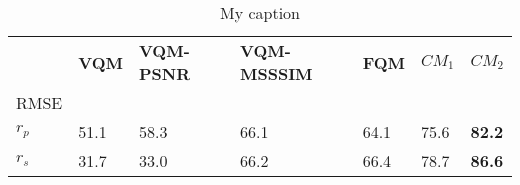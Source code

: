\begin{table}[]
\centering
\caption{My caption}
\label{my-label}
\begin{tabular}{lllllll}
              & \textbf{VQM} & \textbf{VQM-PSNR} & \textbf{VQM-MSSSIM} & \textbf{FQM}  \cite{Tian_2004} & $CM_1$ & $CM_2$  \\
RMSE &              &                   &                     &              &              &               \\
$r_p$            & 51.1        & 58.3              & 66.1                & 64.1         & 75.6         & \textbf{82.2} \\
$r_s$           & 31.7         & 33.0              & 66.2               & 66.4         & 78.7         & \textbf{86.6}
\end{tabular}
\end{table}